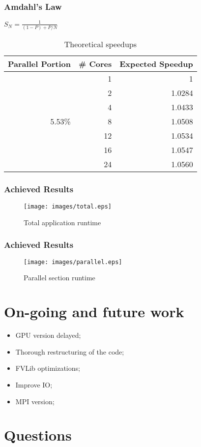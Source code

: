 \documentclass{beamer}
\begin{document}
\begin{frame}
	\frametitle{Amdahl's Law}
		\begin{center}
		$S_{N}=\frac{1}{(1-P) + P/N}$

		
			\begin{table}[!htp]
			\begin{tabular}{|r|r|r|}
			\hline
			\textbf{Parallel Portion} & \textbf{\# Cores} & \textbf{Expected Speedup}\\
			\hline
			 & 1 & 1 \\
			 & 2 & 1.0284 \\
			 & 4 & 1.0433 \\
			 5.53\% & 8 & 1.0508 \\
			 & 12 & 1.0534 \\
			 & 16 & 1.0547 \\
			 & 24 & 1.0560 \\
			\hline
			\end{tabular}
			\caption{Theoretical speedups}
			\label{tab:testcases}
			\end{table}
		\end{center}	
\end{frame}

\begin{frame}
	\frametitle{Achieved Results}
	\begin{center}

	\begin{figure}[!htp]
		\texttt{[image: images/total.eps]}
		\caption{Total application runtime}
		\label{fig:roofline}
	\end{figure}
	\end{center}
\end{frame}

\begin{frame}
	\frametitle{Achieved Results}
	\begin{center}

	\begin{figure}[!htp]
		\texttt{[image: images/parallel.eps]}
		\caption{Parallel section runtime}
		\label{fig:roofline}
	\end{figure}
	\end{center}
\end{frame}


\section{On-going and future work}
\begin{frame}
	\begin{center}
	\begin{itemize}
		\item GPU version delayed;
		\item Thorough restructuring of the code;
		\item FVLib optimizations;
		\item Improve IO;
		\item MPI version;
	\end{itemize}
	\end{center}
\end{frame}

\section{Questions}
\begin{frame}
	\titlepage
	
	
\end{frame}
\end{document}

